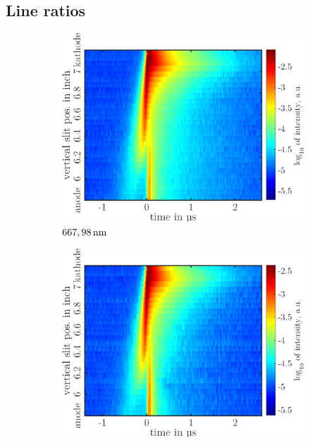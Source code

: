\documentclass[a4paper,10pt]{article}
\begin{document}
		\subsection{Line ratios}
		
			\onecolumn
			
			\begin{figure}
				\centering
				\begin{subfigure}[t]{0.49\textwidth}
					\includegraphics[width=\textwidth]{figures/lineratio/korr667nm}
					\caption{$\unit[667,98]{nm}$}
					\label{img:667nm}
				\end{subfigure}
				\hfill
				\begin{subfigure}[t]{0.49\textwidth}
					\includegraphics[width=\textwidth]{figures/lineratio/korr728nm}

\end{subfigure}
\end{figure}
\end{document}
